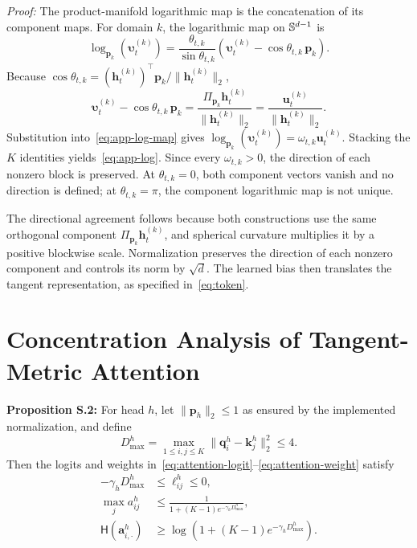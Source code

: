\emph{Proof:} The product-manifold logarithmic map is the concatenation of its component maps. For domain \(k\), the logarithmic map on \(\mathbb{S}^{d-1}\) is
\begin{equation}
\log_{\mathbf p_k}(\boldsymbol{\upsilon}_t^{(k)})
=\frac{\theta_{t,k}}{\sin\theta_{t,k}}
\left(\boldsymbol{\upsilon}_t^{(k)}
-\cos\theta_{t,k}\,\mathbf p_k\right).
\label{eq:app-log-map}
\end{equation}
Because
\(\cos\theta_{t,k}=(\mathbf h_t^{(k)})^\top\mathbf p_k/
\|\mathbf h_t^{(k)}\|_2\),
\begin{equation}
\boldsymbol{\upsilon}_t^{(k)}
-\cos\theta_{t,k}\,\mathbf p_k
=\frac{\Pi_{\mathbf p_k}\mathbf h_t^{(k)}}
{\|\mathbf h_t^{(k)}\|_2}
=\frac{\mathbf u_t^{(k)}}{\|\mathbf h_t^{(k)}\|_2}.
\label{eq:app-tangent}
\end{equation}
Substitution into~\eqref{eq:app-log-map} gives
\(\log_{\mathbf p_k}(\boldsymbol{\upsilon}_t^{(k)})
=\omega_{t,k}\mathbf u_t^{(k)}\). Stacking the \(K\) identities yields~\eqref{eq:app-log}. Since every \(\omega_{t,k}>0\), the direction of each nonzero block is preserved. At \(\theta_{t,k}=0\), both component vectors vanish and no direction is defined; at \(\theta_{t,k}=\pi\), the component logarithmic map is not unique.

The directional agreement follows because both constructions use the same orthogonal component \(\Pi_{\mathbf p_k}\mathbf h_t^{(k)}\), and spherical curvature multiplies it by a positive blockwise scale. Normalization preserves the direction of each nonzero component and controls its norm by \(\sqrt d\). The learned bias then translates the tangent representation, as specified in~\eqref{eq:token}.

\section{Concentration Analysis of Tangent-Metric Attention}
\label{app:attention-proof}
\textbf{Proposition S.2:} For head \(h\), let \(\|\mathbf p_h\|_2\leq1\) as ensured by the implemented normalization, and define
\label{prop:attention-concentration}
\begin{equation}
D_{\max}^{h}
=\max_{1\leq i,j\leq K}\|\mathbf q_i^h-\mathbf k_j^h\|_2^2
\leq4.
\label{eq:app-diameter}
\end{equation}
Then the logits and weights in~\eqref{eq:attention-logit}--\eqref{eq:attention-weight} satisfy
\begin{align}
-\gamma_hD_{\max}^{h}
&\leq \ell_{ij}^{h}\leq0,
\label{eq:app-logit-bound}\\
\max_j a_{ij}^{h}
&\leq\frac{1}{1+(K-1)e^{-\gamma_hD_{\max}^{h}}},
\label{eq:app-weight-bound}\\
\mathsf H(\mathbf a_{i,\cdot}^{h})
&\geq\log\!\left(
1+(K-1)e^{-\gamma_hD_{\max}^{h}}
\right).
\label{eq:app-entropy-bound}
\end{align}

